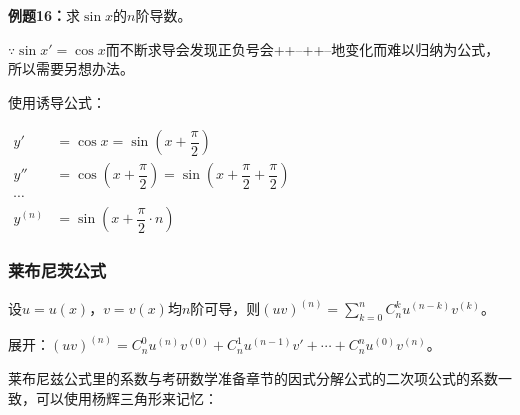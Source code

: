 \documentclass[UTF8, 12pt]{ctexart}
\begin{document}
\textbf{例题16：}求$\sin x$的$n$阶导数。

$\because \sin x'=\cos x$而不断求导会发现正负号会++--++--地变化而难以归纳为公式，所以需要另想办法。

使用诱导公式：

$
\begin{aligned}
    y'& =\cos x=\sin(x+\dfrac{\pi}{2}) \\
    y''& =\cos(x+\dfrac{\pi}{2})=\sin(x+\dfrac{\pi}{2}+\dfrac{\pi}{2}) \\
    \cdots & \\
    y^{(n)}& =\sin(x+\dfrac{\pi}{2}\cdot n)
\end{aligned}
$

\subsubsection{莱布尼茨公式}

设$u=u(x)$，$v=v(x)$均$n$阶可导，则$(uv)^{(n)}=\sum_{k=0}^nC_n^ku^{(n-k)}v^{(k)}$。

展开：$(uv)^{(n)}=C_n^0u^{(n)}v^{(0)}+C_n^1u^{(n-1)}v'+\cdots+C_n^nu^{(0)}v^{(n)}$。

莱布尼兹公式里的系数与考研数学准备章节的因式分解公式的二次项公式的系数一致，可以使用杨辉三角形来记忆：
\end{document}
